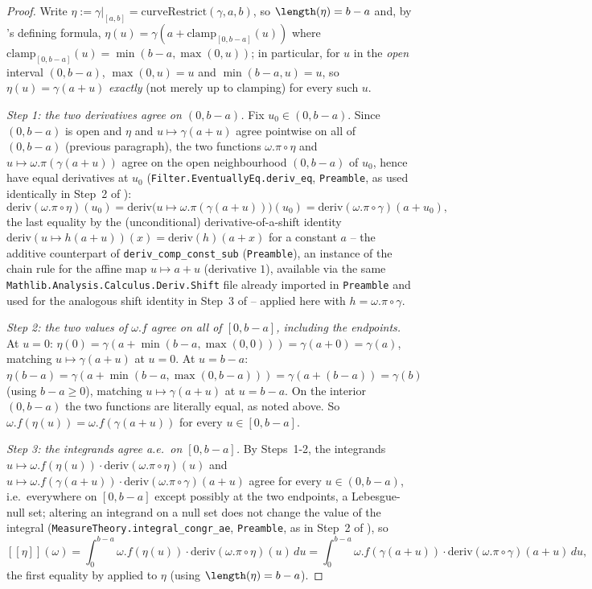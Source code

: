 \begin{proof}
  Write $\eta := \gamma|_{[a,b]} = \mathrm{curveRestrict}(\gamma,a,b)$, so $\length(\eta) = b-a$ and,
  by 's defining formula, $\eta(u) = \gamma(a + \mathrm{clamp}_{[0,b-a]}(u))$
  where $\mathrm{clamp}_{[0,b-a]}(u) = \min(b-a,\max(0,u))$; in particular, for $u$ in the
  \emph{open} interval $(0,b-a)$, $\max(0,u)=u$ and $\min(b-a,u)=u$, so $\eta(u) = \gamma(a+u)$
  \emph{exactly} (not merely up to clamping) for every such $u$.

  \emph{Step 1: the two derivatives agree on $(0,b-a)$.} Fix $u_0 \in (0,b-a)$. Since $(0,b-a)$ is
  open and $\eta$ and $u \mapsto \gamma(a+u)$ agree pointwise on all of $(0,b-a)$ (previous
  paragraph), the two functions $\omega.\pi\circ\eta$ and $u \mapsto \omega.\pi(\gamma(a+u))$ agree
  on the open neighbourhood $(0,b-a)$ of $u_0$, hence have equal derivatives at $u_0$
  (\texttt{Filter.EventuallyEq.deriv\_eq}, \texttt{Preamble}, as used identically in Step~2 of
  ):
  \[
    \mathrm{deriv}(\omega.\pi\circ\eta)(u_0)
      = \mathrm{deriv}\bigl(u \mapsto \omega.\pi(\gamma(a+u))\bigr)(u_0)
      = \mathrm{deriv}(\omega.\pi\circ\gamma)(a+u_0)
    ,
  \]
  the last equality by the (unconditional) derivative-of-a-shift identity
  $\mathrm{deriv}(u \mapsto h(a+u))(x) = \mathrm{deriv}(h)(a+x)$ for a constant $a$ -- the additive
  counterpart of \texttt{deriv\_comp\_const\_sub} (\texttt{Preamble}), an instance of the chain rule
  for the affine map $u \mapsto a+u$ (derivative $1$), available via the same
  \texttt{Mathlib.Analysis.Calculus.Deriv.Shift} file already imported in \texttt{Preamble} and used
  for the analogous shift identity in Step~3 of  -- applied here with
  $h = \omega.\pi\circ\gamma$.

  \emph{Step 2: the two values of $\omega.f$ agree on all of $[0,b-a]$, including the endpoints.} At
  $u=0$: $\eta(0) = \gamma(a+\min(b-a,\max(0,0))) = \gamma(a+0) = \gamma(a)$, matching
  $u\mapsto\gamma(a+u)$ at $u=0$. At $u=b-a$: $\eta(b-a) = \gamma(a+\min(b-a,\max(0,b-a))) =
  \gamma(a+(b-a)) = \gamma(b)$ (using $b-a\ge0$), matching $u\mapsto\gamma(a+u)$ at $u=b-a$. On the
  interior $(0,b-a)$ the two functions are literally equal, as noted above. So $\omega.f(\eta(u)) =
  \omega.f(\gamma(a+u))$ for every $u \in [0,b-a]$.

  \emph{Step 3: the integrands agree a.e.\ on $[0,b-a]$.} By Steps~1-2, the integrands
  $u\mapsto\omega.f(\eta(u))\cdot\mathrm{deriv}(\omega.\pi\circ\eta)(u)$ and
  $u\mapsto\omega.f(\gamma(a+u))\cdot\mathrm{deriv}(\omega.\pi\circ\gamma)(a+u)$ agree for every
  $u\in(0,b-a)$, i.e.\ everywhere on $[0,b-a]$ except possibly at the two endpoints, a
  Lebesgue-null set; altering an integrand on a null set does not change the value of the integral
  (\texttt{MeasureTheory.integral\_congr\_ae}, \texttt{Preamble}, as in Step~2 of
  ), so
  \[
    [[\eta]](\omega)
      = \int_0^{b-a} \omega.f(\eta(u))\cdot\mathrm{deriv}(\omega.\pi\circ\eta)(u)\,du
      = \int_0^{b-a} \omega.f(\gamma(a+u))\cdot\mathrm{deriv}(\omega.\pi\circ\gamma)(a+u)\,du
    ,
  \]
  the first equality by  applied to $\eta$ (using $\length(\eta)=b-a$).


\end{proof}
